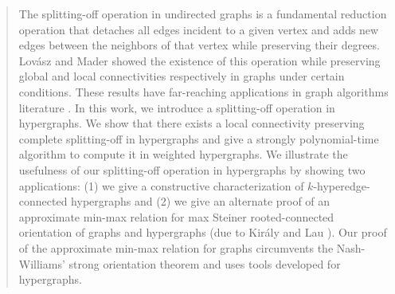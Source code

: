 \begin{abstract}
The splitting-off operation in undirected graphs is a fundamental reduction operation that detaches all edges incident to a given vertex and adds new edges between the neighbors of that vertex while preserving their degrees. Lov\'{a}sz \cite{Lov74, Lovasz-problems-book} and Mader \cite{Mad78} showed the existence of this operation while preserving global and local connectivities respectively in graphs under certain conditions. These results have far-reaching applications in graph algorithms literature \cite{Lov76, Mad78, Frank93:Applications-of-submod-functions, FK02, Kiraly-Lau, Fra92, GB93, Fra94, JFJ95, Frank-book, nagamochi_ibaraki_2008_book, NNI97, HW96, Goe01, Jor03, Kri03, JMS03, CFLY11, BHTP03, Lau07, CS08, NZ20, BN23}. 
In this work, we introduce a splitting-off operation in hypergraphs. We show that there exists a local connectivity preserving complete splitting-off in hypergraphs and give a strongly polynomial-time algorithm to compute it in weighted hypergraphs. We illustrate the usefulness of our splitting-off operation in hypergraphs by showing two applications: (1) we give a constructive characterization of $k$-hyperedge-connected hypergraphs and (2) we give an alternate proof of an approximate min-max relation for max Steiner rooted-connected orientation of graphs and hypergraphs (due to Kir\'{a}ly and Lau \cite{Kiraly-Lau}). Our proof of the approximate min-max relation for graphs circumvents the Nash-Williams' strong orientation theorem and uses tools developed for hypergraphs.
\end{abstract}